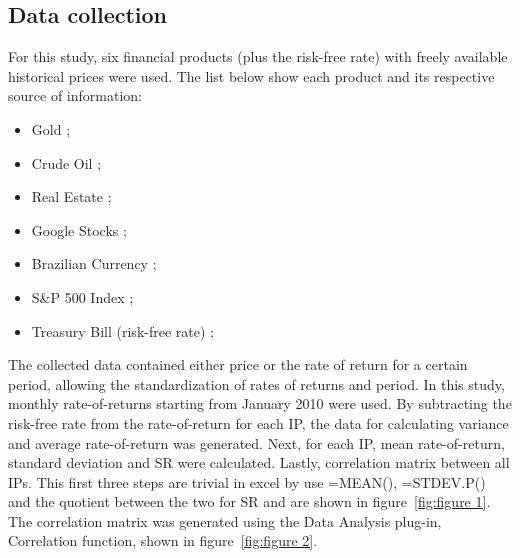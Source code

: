 \documentclass[a4paper,man,natbib]{apa6}
\begin{document}
	\subsection{Data collection}
	For this study, six financial products (plus the risk-free rate) with freely available historical prices were used. The list below show each product and its respective source of information:
	\begin{itemize}
		\item Gold \cite{gold_s};
		\item Crude Oil \cite{crude_s};
		\item Real Estate \cite{reit_s};		
		\item Google Stocks \cite{goog_s};
		\item Brazilian Currency \cite{bzf_s};
		\item S\&P 500 Index \cite{vfinx_s};
		\item Treasury Bill (risk-free rate) \cite{riskfree_s};
	\end{itemize}
	The collected data contained either price or the rate of return for a certain period, allowing the standardization of rates of returns and period. In this study, monthly rate-of-returns starting from January 2010 were used. By subtracting the risk-free rate from the rate-of-return for each IP, the data for calculating variance and average rate-of-return was generated.
	Next, for each IP, mean rate-of-return, standard deviation and SR were calculated. Lastly, correlation matrix between all IPs. This first three steps are trivial in excel by use =MEAN(), =STDEV.P() and the quotient between the two for SR and are shown in figure~\ref{fig:figure 1}. The correlation matrix was generated using the Data Analysis plug-in, Correlation function, shown in figure~\ref{fig:figure 2}.
\end{document}
